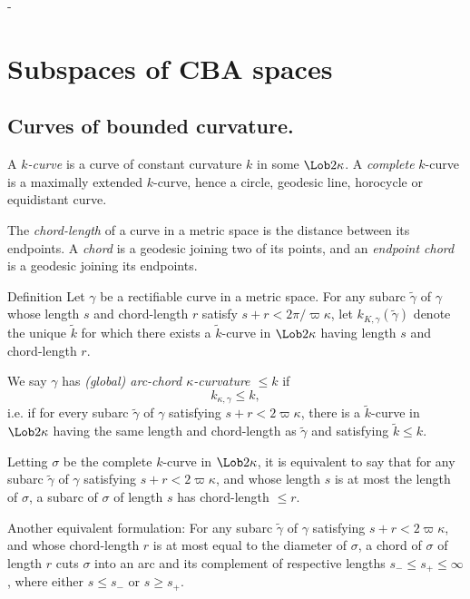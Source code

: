 -%



\chapter{Subspaces of CBA spaces}

\section{Curves of bounded curvature.}\label{sec:cbc}

A {\it $k$-curve}  is a curve of constant
curvature $k$ in some $\Lob2\kappa$.  A {\it complete} $k$-curve is a maximally extended $k$-curve, hence a circle, geodesic
line, horocycle or equidistant curve.  

The \emph{chord-length} of a curve in a metric space is the distance between its endpoints.  A \emph{chord} is a geodesic joining two of its points, and an \emph{endpoint chord} is a geodesic joining its endpoints.

\begin{thm}{Definition}\label{def:arc-chord}
Let $\gamma$ be a rectifiable curve in a metric space. For any subarc $\tilde\gamma$ of $\gamma$ whose length $s$ and chord-length $r$ satisfy $s+r <
2\pi/\varpi\kappa$, let $k_{K,\gamma}( \tilde \gamma)$ denote the unique $\tilde k$
for which there exists a $ \tilde k$-curve in $\Lob2\kappa$ having length $s$ and
chord-length $r$. 
 
 We say $\gamma$ has \emph{(global) arc-chord $\kappa$-curvature $\le k$} if 
 $$k_{\kappa,\gamma} \le k,$$
i.e. if for every
subarc $\tilde\gamma$ of $\gamma$ satisfying $s+r < 2\varpi\kappa$, there is a
$ \tilde k$-curve in $\Lob2\kappa$  having the same length and chord-length as $ \tilde \gamma$ and satisfying $ \tilde k \le
k$. 
\end{thm}

Letting  $\sigma$ be the complete $k$-curve in  $\Lob2\kappa$, it is equivalent to say that for any subarc $ \tilde \gamma$ of $\gamma$  satisfying $s+r < 2\varpi\kappa$,  and whose length $s$ is at most the length of  $\sigma$, a subarc of $\sigma$ of length $s$ has chord-length $\le r$.  

Another equivalent formulation:  For any subarc $ \tilde \gamma$ of $\gamma$ satisfying $s+r < 2\varpi\kappa$,  and whose chord-length $r$ is  at most equal to the diameter of $\sigma$, a chord of  $\sigma$ of length $r$ cuts $\sigma$ into an arc and its complement of respective lengths $s_-\le s_+\le\infty$, where either $s\le s_-$ or $s\ge s_+$. 

